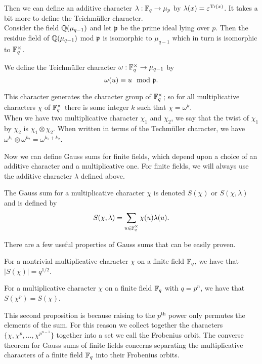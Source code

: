 \noindent Then we can define an additive character $\lambda : \mathbb{F}_q \to \mu_p$ by $\lambda(x) = \varepsilon^{\textrm{Tr}(x)}$.
It takes a bit more to define the Teichm\"uller character.\\

Consider the field $\mathbb{Q}(\mu_{q-1})$ and let $\mathfrak{p}$ be the prime ideal lying over $p$.
Then the residue field of $\mathbb{Q}(\mu_{q-1})$ mod $\mathfrak{p}$ is isomorphic to $\mu_{q-1}$ which in turn is isomorphic to $\mathbb{F}_q^\times$.
\begin{defn}\label{def:Teichmuller-char}
We define the Teichm\"uller character $\omega : \mathbb{F}_q^\times \to \mu_{q-1}$ by \[\omega (u) \equiv  u \mod {\mathfrak{p}}.\]
\end{defn}
\noindent This character generates the character group of $\mathbb{F}_q^\times$; so for all multiplicative characters $\chi$ of $\mathbb{F}_q^\times$ there is some integer $k$ such that $\chi = \omega^k$.\\
When we have two multiplicative character $\chi_1$ and $\chi_2$, we say that the twist of $\chi_1$ by $\chi_2$ is $\chi_1 \otimes \chi_2$.
When written in terms of the Techm\"uller character, we have $\omega^{k_1} \otimes \omega^{k_2} = \omega^{k_1+k_2}$.

Now we can define Gauss sums for finite fields, which depend upon a choice of an additive character and a multiplicative one. 
For finite fields, we will always use the additive character $\lambda$ defined above.
\begin{defn}\label{def:Gsum-FF}
The Gauss sum for a multiplicative character $\chi$ is denoted $S(\chi)$ or $S(\chi, \lambda)$ and is defined by \[S(\chi, \lambda) = \sum_{u \in \mathbb{F}_q^\times} \chi(u) \lambda(u).\]
\end{defn}
\noindent There are a few useful properties of Gauss sums that can be easily proven.
\begin{prop}
For a nontrivial multiplicative character $\chi$ on a finite field $\mathbb{F}_q$, we have that $|S(\chi)| = q^{1/2}$.
\end{prop}
\begin{prop}
For a multiplicative character $\chi$ on a finite field $\mathbb{F}_q$ with $q = p^n$, we have that $S(\chi^p) = S(\chi)$.
\end{prop}
This second proposition is because raising to the $p^\text{th}$ power only permutes the elements of the sum. 
For this reason we collect together the characters $\{\chi, \chi^{p}, \ldots, \chi^{p^{n-1}}\}$ together into a set we call the Frobenius orbit.
The converse theorem for Gauss sums of finite fields concerns separating the multiplicative characters of a finite field $\mathbb{F}_q$ into their Frobenius orbits.\\


